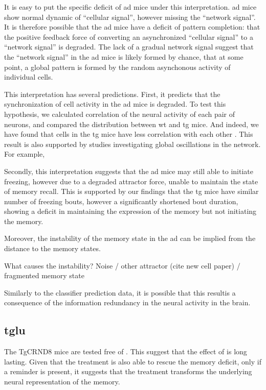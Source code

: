 It is easy to put the specific deficit of \gls{ad} mice under this interpretation. \gls{ad} mice show normal dynamic of ``cellular signal'', however missing the ``network signal''. It is therefore possible that the \gls{ad} mice have a deficit of pattern completion: that the positive feedback force of converting an asynchronized ``cellular signal'' to a ``network signal'' is degraded. The lack of a gradual network signal suggest that the ``network signal'' in the \gls{ad} mice is likely formed by chance, that at some point, a global pattern is formed by the random asynchonous activity of individual cells. 

This interpretation has several predictions. First, it predicts that the synchronization of cell activity in the \gls{ad} mice is degraded. To test this hypothesis, we calculated correlation of the neural activity of each pair of neurons, and compared the distribution between \gls{wt} and \gls{tg} mice. And indeed, we have found that cells in the \gls{tg} mice have less correlation with each other . This result is also supported by studies investigating global oscillations in the network. For example,   

Secondly, this interpretation suggests that the \gls{ad} mice may still able to initiate freezing, however due to a degraded attractor force, unable to maintain the state of memory recall. This is supported by our findings that the \gls{tg} mice have similar number of freezing bouts, however a significantly shortened bout duration, showing a deficit in maintaining the expression of the memory but not initiating the memory.  

Moreover, the instability of the memory state in the \gls{ad} can be implied from the distance to the memory states. 

What causes the instability? Noise / other attractor (cite new cell paper) / fragmented memory state 

Similarly to the classifier prediction data, it is possible that this resultis a consequence of the information redundancy in the neural activity in the brain. 

\subsection{tglu}

The TgCRND8 mice are tested free of \tglu. This suggest that the effect of \tglu is long lasting. Given that the \tglu treatment is also able to rescue the memory deficit, only if a reminder is present, it suggests that the \tglu treatment transforms the underlying neural representation of the memory.  


